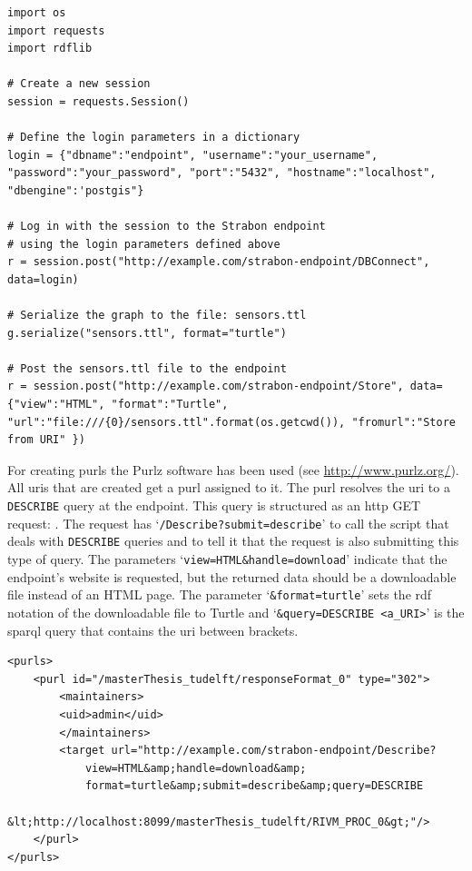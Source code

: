 \begin{lstlisting}[float,caption={Serializing the RDFlib graph object and posting it to the Strabon endpoint}, label={lst:rdflib2}]
import os
import requests
import rdflib

# Create a new session
session = requests.Session()

# Define the login parameters in a dictionary
login = {"dbname":"endpoint", "username":"your_username", "password":"your_password", "port":"5432", "hostname":"localhost", "dbengine":'postgis"}

# Log in with the session to the Strabon endpoint 
# using the login parameters defined above
r = session.post("http://example.com/strabon-endpoint/DBConnect", data=login)

# Serialize the graph to the file: sensors.ttl
g.serialize("sensors.ttl", format="turtle")

# Post the sensors.ttl file to the endpoint
r = session.post("http://example.com/strabon-endpoint/Store", data={"view":"HTML", "format":"Turtle", "url":"file:///{0}/sensors.ttl".format(os.getcwd()), "fromurl":"Store from URI" }) 
\end{lstlisting}  


For creating \aclp{purl} the Purlz software has been used (see \url{http://www.purlz.org/}). All \acp{uri} that are created get a \ac{purl} assigned to it. The \ac{purl} resolves the \ac{uri} to a \texttt{DESCRIBE} query at the endpoint. This query is structured as an \ac{http} GET request: \texttt{}. The request has `\texttt{/Describe?submit=describe}' to call the script that deals with \texttt{DESCRIBE} queries and to tell it that the request is also submitting this type of query. The parameters `\texttt{view=HTML\&handle=download}' indicate that the endpoint's website is requested, but the returned data should be a downloadable file instead of an HTML page. The parameter `\texttt{\&format=turtle}' sets the \ac{rdf} notation of the downloadable file to Turtle and `\texttt{\&query=DESCRIBE <a\_URI>}' is the \ac{sparql} query that contains the \ac{uri} between brackets. 

\begin{lstlisting}[float,caption={Example of a PURL batch file (containing one PURL)}, label={lst:PURL}]
<purls>
	<purl id="/masterThesis_tudelft/responseFormat_0" type="302">
		<maintainers>
		<uid>admin</uid>
		</maintainers>
		<target url="http://example.com/strabon-endpoint/Describe?
			view=HTML&amp;handle=download&amp;
			format=turtle&amp;submit=describe&amp;query=DESCRIBE 
			&lt;http://localhost:8099/masterThesis_tudelft/RIVM_PROC_0&gt;"/>
	</purl>
</purls>
\end{lstlisting}

